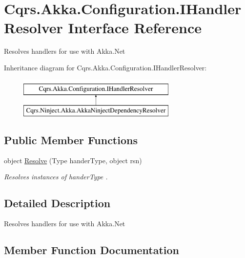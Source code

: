 \hypertarget{interfaceCqrs_1_1Akka_1_1Configuration_1_1IHandlerResolver}{}\section{Cqrs.\+Akka.\+Configuration.\+I\+Handler\+Resolver Interface Reference}
\label{interfaceCqrs_1_1Akka_1_1Configuration_1_1IHandlerResolver}


Resolves handlers for use with Akka.\+Net  


Inheritance diagram for Cqrs.\+Akka.\+Configuration.\+I\+Handler\+Resolver\+:\begin{figure}[H]
\begin{center}
\leavevmode
\includegraphics[height=2.000000cm]{interfaceCqrs_1_1Akka_1_1Configuration_1_1IHandlerResolver}
\end{center}
\end{figure}
\subsection*{Public Member Functions}
\begin{DoxyCompactItemize}
\item 
object \hyperlink{interfaceCqrs_1_1Akka_1_1Configuration_1_1IHandlerResolver_abae10eed2d92eb3f2831c5eba7e3c2d3_abae10eed2d92eb3f2831c5eba7e3c2d3}{Resolve} (Type hander\+Type, object rsn)
\begin{DoxyCompactList}\small\item\em Resolves instances of {\itshape hander\+Type} . \end{DoxyCompactList}\end{DoxyCompactItemize}


\subsection{Detailed Description}
Resolves handlers for use with Akka.\+Net 



\subsection{Member Function Documentation}
\mbox{\label{interfaceCqrs_1_1Akka_1_1Configuration_1_1IHandlerResolver_abae10eed2d92eb3f2831c5eba7e3c2d3_abae10eed2d92eb3f2831c5eba7e3c2d3}} 
